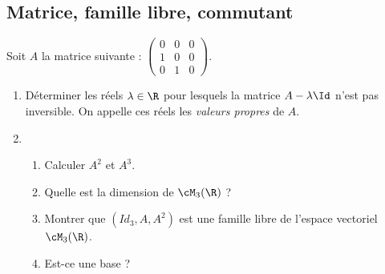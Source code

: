 \subsection{Matrice, famille libre, commutant}

\begin{exercice}
Soit $A$ la matrice suivante : 
$\left(\begin{array}{ccc}
0&0&0\\
1&0&0\\
0&1&0
\end{array}
\right).$
\begin{enumerate}
\item Déterminer les réels $\lambda\in \R$ pour lesquels la matrice $A-\lambda \Id$ n'est pas  inversible. On appelle ces réels les \emph{valeurs propres} de $A$. 
\item
\begin{enumerate}
\item  Calculer $A^2$ et $A^3$. 
\item Quelle est la dimension de $\cM_3(\R)$ ? 
\item Montrer que $(Id_3, A, A^2)$ est une famille libre de l'espace vectoriel $\cM_3(\R)$.
\item Est-ce une base ? 
\end{enumerate}


\end{enumerate}
\end{exercice}
